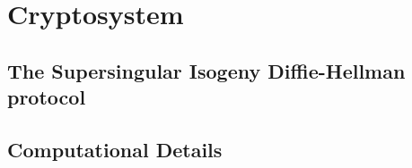 \section{Cryptosystem}
\subsection{The Supersingular Isogeny Diffie-Hellman protocol}
\subsection{Computational Details}